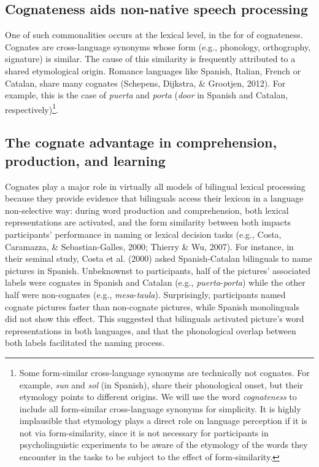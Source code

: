 \documentclass[
  english,
  man,floatsintext]{apa6}
\begin{document}
\hypertarget{cognateness-aids-non-native-speech-processing}{%
\subsection{Cognateness aids non-native speech processing}\label{cognateness-aids-non-native-speech-processing}}

One of such commonalities occurs at the lexical level, in the for of cognateness. Cognates are cross-language synonyms whose form (e.g., phonology, orthography, signature) is similar. The cause of this similarity is frequently attributed to a shared etymological origin. Romance languages like Spanish, Italian, French or Catalan, share many cognates (Schepens, Dijkstra, \& Grootjen, 2012). For example, this is the case of \emph{puerta} and \emph{porta} (\emph{door} in Spanish and Catalan, respectively)\footnote{Some form-similar cross-language synonyms are technically not cognates. For example, \emph{sun} and \emph{sol} (in Spanish), share their phonological onset, but their etymology points to different origins. We will use the word \emph{cognateness} to include all form-similar cross-language synonyms for simplicity. It is highly implausible that etymology plays a direct role on language perception if it is not via form-similarity, since it is not necessary for participants in psycholinguistic experiments to be aware of the etymology of the words they encounter in the tasks to be subject to the effect of form-similarity.}.

\hypertarget{the-cognate-advantage-in-comprehension-production-and-learning}{%
\subsection{The cognate advantage in comprehension, production, and learning}\label{the-cognate-advantage-in-comprehension-production-and-learning}}

Cognates play a major role in virtually all models of bilingual lexical processing because they provide evidence that bilinguals access their lexicon in a language non-selective way: during word production and comprehension, both lexical representations are activated, and the form similarity between both impacts participants' performance in naming or lexical decision tasks (e.g., Costa, Caramazza, \& Sebastian-Galles, 2000; Thierry \& Wu, 2007). For instance, in their seminal study, Costa et al. (2000) asked Spanish-Catalan bilinguals to name pictures in Spanish. Unbeknownst to participants, half of the pictures' associated labels were cognates in Spanish and Catalan (e.g., \emph{puerta}-\emph{porta}) while the other half were non-cognates (e.g., \emph{mesa}-\emph{taula}). Surprisingly, participants named cognate pictures faster than non-cognate pictures, while Spanish monolinguals did not show this effect. This suggested that bilinguals activated picture's word representations in both languages, and that the phonological overlap between both labels facilitated the naming process.
\end{document}
